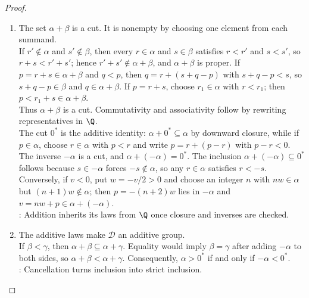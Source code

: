 \begin{theorem}
\begin{proof}
\begin{enumerate}[label=(\roman*)]
\item {}
The set $\alpha+\beta$ is a cut. It is nonempty by choosing one element from each summand.\\
If $r'\notin\alpha$ and $s'\notin\beta$, then every $r\in\alpha$ and $s\in\beta$ satisfies $r<r'$ and $s<s'$, so $r+s<r'+s'$; hence $r'+s'\notin\alpha+\beta$, and $\alpha+\beta$ is proper. If $p=r+s\in\alpha+\beta$ and $q<p$, then $q=r+(s+q-p)$ with $s+q-p<s$, so $s+q-p\in\beta$ and $q\in\alpha+\beta$. If $p=r+s$, choose $r_1\in\alpha$ with $r<r_1$; then $p<r_1+s\in\alpha+\beta$.\\
Thus $\alpha+\beta$ is a cut. Commutativity and associativity follow by rewriting representatives in $\Q$.\\
The cut $0^*$ is the additive identity: $\alpha+0^*\subseteq\alpha$ by downward closure, while if $p\in\alpha$, choose $r\in\alpha$ with $p<r$ and write $p=r+(p-r)$ with $p-r<0$.\\
The inverse $-\alpha$ is a cut, and $\alpha+(-\alpha)=0^*$. The inclusion $\alpha+(-\alpha)\subseteq0^*$ follows because $s\in-\alpha$ forces $-s\notin\alpha$, so any $r\in\alpha$ satisfies $r<-s$. Conversely, if $v<0$, put $w=-v/2>0$ and choose an integer $n$ with $nw\in\alpha$ but $(n+1)w\notin\alpha$; then $p=-(n+2)w$ lies in $-\alpha$ and $v=nw+p\in\alpha+(-\alpha)$.\\
: Addition inherits its laws from $\Q$ once closure and inverses are checked.

\item {}
The additive laws make $\mathscr{D}$ an additive group.\\
If $\beta<\gamma$, then $\alpha+\beta\subseteq\alpha+\gamma$. Equality would imply $\beta=\gamma$ after adding $-\alpha$ to both sides, so $\alpha+\beta<\alpha+\gamma$. Consequently, $\alpha>0^*$ if and only if $-\alpha<0^*$.\\
: Cancellation turns inclusion into strict inclusion.


\end{enumerate}
\end{proof}
\end{theorem}

